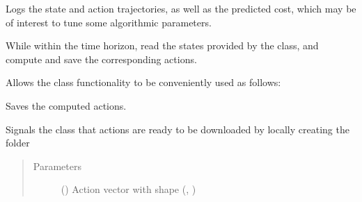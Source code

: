 \documentclass[letterpaper,10pt,english,openany,oneside]{sphinxmanual}
\begin{document}
\begin{fulllineitems}

\begin{fulllineitems}
\label{\detokenize{_modules/cluster:cluster.Cluster.log}}
Logs the state and action trajectories, as well as the predicted cost,
which may be of interest to tune some algorithmic parameters.

\end{fulllineitems}


\begin{fulllineitems}
\label{\detokenize{_modules/cluster:cluster.Cluster.loop}}
While within the time horizon, read the states provided by the 
class, and compute and save the corresponding actions.

Allows the class functionality to be conveniently used as follows:

\begin{sphinxVerbatim}[commandchars=\\\{\}]
    
\end{sphinxVerbatim}

\end{fulllineitems}


\begin{fulllineitems}
\label{\detokenize{_modules/cluster:cluster.Cluster.sendAction}}
Saves the computed actions.

Signals the  class that actions are ready to be downloaded by
locally creating the  folder
\begin{quote}\begin{description}
\item[{Parameters}] \leavevmode
{} () \textendash{} Action vector with shape (, )

\end{description}\end{quote}

\end{fulllineitems}


\end{fulllineitems}
\end{document}
